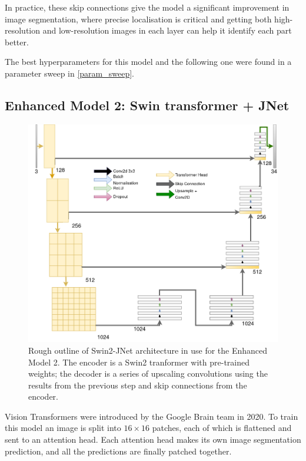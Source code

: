 In practice, these skip connections give the model a significant improvement in image segmentation, where precise localisation is critical and getting both high-resolution and low-resolution images in each layer can help it identify each part better.

The best hyperparameters for this model and the following one were found in a parameter sweep in \cref{param_sweep}.

\subsection{Enhanced Model 2: Swin transformer + JNet }

\begin{figure}
	\centering
	\includegraphics[height=.4\textheight]{Swin2_JNet}
	\caption{Rough outline of Swin2-JNet architecture in use for the Enhanced Model 2. The encoder is a Swin2 tranformer with pre-trained weights; the decoder is a series of upscaling convolutions using the results from the previous step and skip connections from the encoder.}
	\label{swin2}
\end{figure}

Vision Transformers were introduced by the Google Brain team in 2020\cite{vision_transformers}.
To train this model an image is split into $16 \times 16$ patches, each of which is flattened and sent to an attention head.
Each attention head makes its own image segmentation prediction, and all the predictions are finally patched together.

